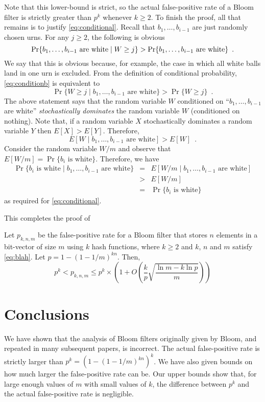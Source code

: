 \documentclass[lotsofwhite]{patmorin}
\begin{document}
Note that this lower-bound is strict, so the actual false-positive
rate of a Bloom filter is strictly greater than $p^k$
whenever $k\ge 2$. To finish the proof,
all that remains is to justify \eqref{eq:conditional}.  Recall that
$b_1,\ldots,b_{i-1}$ are just randomly chosen urns.  For any
$j\ge 2$, the following is obvious
\begin{equation}
	\Pr\{\mbox{$b_1,\ldots,b_{i-1}$ are white} \mid W\ge j \}
		> \Pr\{\mbox{$b_1,\ldots,b_{i-1}$ are white}\} \enspace .
	\eqlabel{conditionb}
\end{equation}
We say that this is obvious because, for example, the case in which
all white balls land in one urn is excluded.  From
the definition of conditional probability, \eqref{eq:conditionb} is
equivalent to
\[
	\Pr\{W\ge j \mid \mbox{$b_1,\ldots,b_{i-1}$ are white}\}
	> \Pr\{W \ge j \} \enspace .
\]
The above statement says that the random variable $W$ conditioned on
``$b_1,\ldots,b_{i-1}$ are white'' \emph{stochastically dominates} the
random variable $W$ (conditioned on nothing).  Note that, if a random
variable $X$ stochastically dominates a random variable $Y$ then
$E[X]> E[Y]$.  Therefore,
\[
	E[W\mid \mbox{$b_1,\ldots,b_{i-1}$ are white}] > E[W] \enspace .
\]
Consider the random variable $W/m$ and observe that
$E[W/m]=\Pr\{\mbox{$b_i$ is white}\}$.  Therefore, we have
\begin{eqnarray*}
   \Pr\{\mbox{$b_i$ is white} \mid \mbox{$b_1,\ldots,b_{i-1}$ are
	white}\}
   &=& E[W/m\mid \mbox{$b_1,\ldots,b_{i-1}$ are white}] \\
   &>& E[W/m] \\
   &=&\Pr\{\mbox{$b_i$ is white}\}
\end{eqnarray*}
as required for \eqref{eq:conditional}.

This completes the proof of
\begin{thm}
Let $p_{k,n,m}$ be the false-positive rate for a Bloom filter that
stores $n$ elements in a bit-vector of size $m$ using $k$ hash
functions, where $k\ge 2$ and  $k$, $n$ and $m$ satisfy
\eqref{eq:blah}. Let $p=1-(1-1/m)^{kn}$.  Then,
\[
    p^k < p_{k,n,m} \le 
	p^k \times \left(1+ O\left(\frac{k}{p}
	\sqrt{\frac{\ln m-k\ln p}{m}}\right)\right)
\]
\end{thm}

\section{Conclusions} 

We have shown that the analysis of Bloom filters originally given by
Bloom, and repeated in many subsequent papers, is incorrect.  The
actual false-positive rate is strictly larger than
$p^k=(1-(1-1/m)^{kn})^k$.  We have also given bounds on how much
larger the false-positive rate can be.  Our upper bounds show that,
for large enough values of $m$ with small values of $k$, the
difference between $p^k$ and the actual false-positive rate is
negligible.
\end{document}
